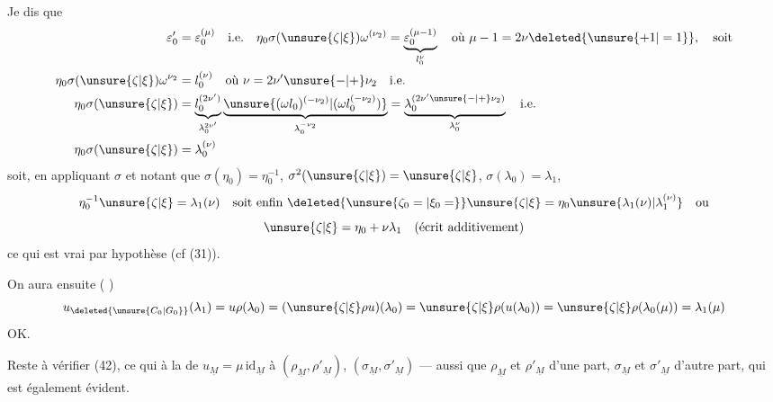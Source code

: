 
Je dis que
\[
\begin{aligned}
\varepsilon'_0&=\varepsilon_0^{(\mu)}\quad\text{i.e.}\quad
\eta_0\sigma(\unsure{\zeta|\xi})\omega^{(\nu_2)}
 =\underbrace{\varepsilon_0^{(\mu-1)}}_{l_0^\nu}
\quad\text{où }\mu-1=2\nu\deleted{\unsure{+1|=1}},\quad\text{soit}\\
\eta_0\sigma(\unsure{\zeta|\xi})\omega^{\nu_2}&=l_0^{(\nu)}
\quad\text{où }\nu=2\nu'\unsure{-|+}\nu_2\quad\text{i.e.}\\
\eta_0\sigma(\unsure{\zeta|\xi})
 &=\underbrace{l_0^{(2\nu')}}_{\lambda_0^{2\nu'}}
 \underbrace{\unsure{(\omega l_0)^{(-\nu_2)}|(\omega l_0^{(-\nu_2)})}}_{\lambda_0^{-\nu_2}}
 =\underbrace{\lambda_0^{(2\nu'\unsure{-|+}\nu_2)}}_{\lambda_0^\nu}
 \quad\text{i.e.}\\
\eta_0\sigma(\unsure{\zeta|\xi})&=\lambda_0^{(\nu)}
\end{aligned}
\]
soit, en appliquant $\sigma$ et notant que
$\sigma(\eta_0)=\eta_0^{-1}$, $\sigma^2(\unsure{\zeta|\xi})=\unsure{\zeta|\xi}$,
$\sigma(\lambda_0)=\lambda_1$,
\[
\eta_0^{-1}\unsure{\zeta|\xi}=\lambda_1(\nu)
\quad\text{soit enfin }\deleted{\unsure{\zeta_0=|\xi_0=}}
\unsure{\zeta|\xi}=\eta_0\unsure{\lambda_1(\nu)|\lambda_1^{(\nu)}}
\quad\text{ou}
\]
\[
\unsure{\zeta|\xi}=\eta_0+\nu\lambda_1\quad\text{(écrit additivement)}
\]
ce qui est vrai par hypothèse (cf (31)).

On aura ensuite
(
)
\[
u_{\deleted{\unsure{C_0|G_0}}}(\lambda_1)
 =u\rho(\lambda_0)
 =(\unsure{\zeta|\xi}\rho u)(\lambda_0)
 =\unsure{\zeta|\xi}\rho(u(\lambda_0))
 =\unsure{\zeta|\xi}\rho(\lambda_0(\mu))
 =\lambda_1(\mu)
\]
OK.

Reste à vérifier (42), ce qui 
 à la  de
$u_{\underline M}=\mu\,\mathrm{id}_{\underline M}$ à
$(\rho_{\underline M},\rho'_{\underline M})$,
$(\sigma_{\underline M},\sigma'_{\underline M})$
---  aussi que
$\rho_{\underline M}$ et $\rho'_{\underline M}$ d'une part,
$\sigma_{\underline M}$ et $\sigma'_{\underline M}$ d'autre part,
qui est également évident.

